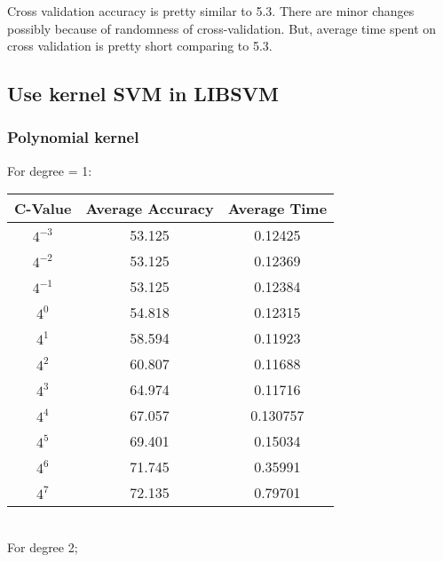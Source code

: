 \documentclass[letter,11pt]{article}
\begin{document}
Cross validation accuracy is pretty similar to 5.3. There are minor changes possibly because of randomness of cross-validation. But, average time spent on cross validation is pretty short comparing to 5.3.
			
			
\subsection{Use kernel SVM in LIBSVM}

\subsubsection{Polynomial kernel}

For degree = 1:

		\begin{tabular}{|c| c |c |} 
			\hline
			C-Value & Average Accuracy & Average Time \\ [0.5ex] 			
			\hline
			$4^{-3}$ & 53.125  & 0.12425 \\ [0.5ex] 
			\hline
			$4^{-2}$ & 53.125 & 0.12369  \\ 
			\hline
			$4^{-1}$ &  53.125 	  & 0.12384\\
			\hline
			$4^{0}$ &  54.818  & 0.12315\\
			\hline
			$4^{1}$ & 58.594  & 0.11923\\
			\hline
			$4^{2}$ &  60.807 & 0.11688\\
			\hline
			$4^{3}$ &   64.974  & 0.11716\\
			\hline
			$4^{4}$ &  67.057  & 0.130757\\
			\hline
			$4^{5}$ &  69.401   & 0.15034\\
			\hline
			$4^{6}$ &  71.745 & 0.35991\\
			\hline
			$4^{7}$ &  72.135 & 0.79701\\
			\hline
						
		\end{tabular}\\
		
		For degree 2;
		
\end{document}
